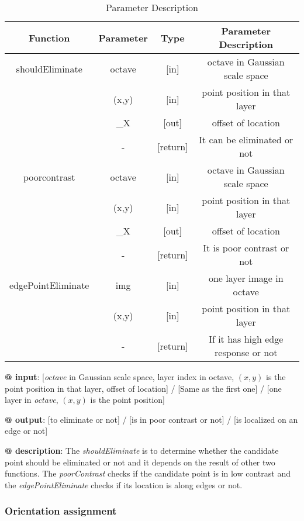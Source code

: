 \documentclass[paper=a4, fontsize=11pt]{scrartcl} %
\numberwithin{equation}{section} %
\numberwithin{figure}{section} %
\numberwithin{table}{section} %
\begin{document}
\begin{table}[h]
    \centering
    \begin{tabular}{|c|c|c|c|}
        \hline
        \textbf{Function} & \textbf{Parameter} & \textbf{Type} & \textbf{Parameter Description} \\\hline
        shouldEliminate & octave & [in] & octave in Gaussian scale space \\
                        & (x,y) & [in] & point position in that layer \\
                        & \_X & [out] & offset of location\\\hline
                        & - & [return] & It can be eliminated or not \\\hline
        poorcontrast & octave & [in] & octave in Gaussian scale space \\
                        & (x,y) & [in] & point position in that layer \\
                        & \_X & [out] & offset of location\\\hline
                        & - & [return] & It is poor contrast or not \\\hline
        edgePointEliminate & img & [in] & one layer image in octave \\
                  & (x,y) & [in] & point position in that layer \\
                        & - &[return] & If it has high edge response or not \\\hline
    \end{tabular}
    \caption{Parameter Description}\label{nolock}
\end{table}

\textbf{@ input}: [\textsl{octave} in Gaussian scale space, layer index in octave, $(x,y)$ is the point position in that layer, offset of location] / [Same as the first one] / [one layer in \textsl{octave}, $(x,y)$ is the point position]

\textbf{@ output}: [to eliminate or not] / [is in poor contrast or not] / [is localized on an edge or not]

\textbf{@ description}: The \textsl{shouldEliminate} is to determine whether the candidate point should be eliminated or not and it depends on the result of other two functions. The \textsl{poorContrast} checks if the candidate point is in low contrast and the \textsl{edgePointEliminate} checks if its location is along edges or not.

\subsubsection{Orientation assignment}
\end{document}
